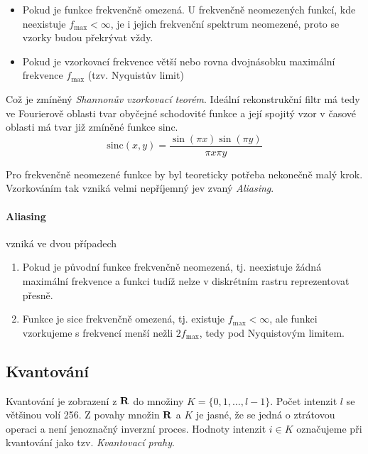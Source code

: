 \begin{itemize}
\item Pokud je funkce frekvenčně omezená. U frekvenčně neomezených funkcí, kde neexistuje $f_{\max}<\infty$, je i jejich
frekvenční spektrum neomezené, proto se vzorky budou překrývat vždy.
\item Pokud je vzorkovací frekvence větší nebo rovna dvojnásobku maximální frekvence $f_{\max}$ (tzv. Nyquistův limit)
\end{itemize}

 
Což je zmíněný {\em Shannonův vzorkovací teorém}. Ideální rekonstrukční filtr má tedy ve Fourierově oblasti tvar obyčejné
schodovité funkce a její spojitý vzor v časové oblasti  má tvar již zmíněné funkce $\mathrm{sinc}$.
\begin{equation}
\mathrm{sinc}(x,y)=\frac{\sin(\pi x)\sin(\pi y)}{\pi x \pi y}
\end{equation}

Pro frekvenčně neomezené funkce by byl teoreticky potřeba nekonečně malý krok. Vzorkováním tak vzniká velmi
nepříjemný jev zvaný {\em Aliasing}.

\paragraph{Aliasing} vzniká ve dvou případech
\begin{enumerate}
\item Pokud je původní funkce frekvenčně neomezená, tj. neexistuje žádná maximální frekvence a funkci tudíž nelze v diskrétním
rastru reprezentovat přesně.
\item Funkce je sice frekvenčně omezená, tj. existuje $f_{\max}<\infty$, ale funkci vzorkujeme s frekvencí menší nežli
$2f_{\max}$, tedy pod Nyquistovým limitem.
\end{enumerate}

\subsection{Kvantování} 

Kvantování je zobrazení z $\mathbf{R}$ do množiny $K=\{0,1,\dots,l-1\}$. Počet intenzit $l$ se většinou volí 256.
Z povahy množin $\mathbf{R}$ a $K$ je jasné, že se jedná o ztrátovou operaci a není jenoznačný inverzní proces. Hodnoty intenzit
$i\in K$ označujeme při kvantování jako tzv. {\em Kvantovací prahy}.

